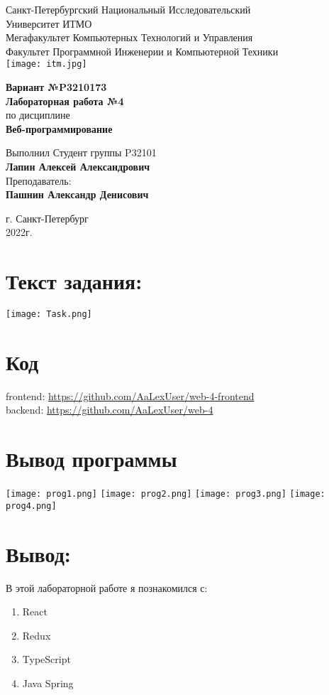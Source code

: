 \documentclass[12pt,one column]{article}
\begin{document}
\begin{center}
    Санкт-Петербургский Национальный Исследовательский\\ 
    Университет ИТМО\\
    Мегафакультет Компьютерных Технологий и Управления\\
    Факультет Программной Инженерии и Компьютерной Техники \\
    \texttt{[image: itm.jpg]} %
\end{center}
\vspace{1cm}


\begin{center}
    \large \textbf{Вариант №P3210173}\\
    \textbf{Лабораторная работа №4}\\
    по дисциплине\\
    \textbf{Веб-программирование}
\end{center}

\vspace{2cm}

\begin{flushright}
  Выполнил Студент  группы P32101\\
  \textbf{Лапин Алексей Александрович}\\
  Преподаватель: \\
  \textbf{Пашнин Александр Денисович}\\
\end{flushright}

\vspace{6cm}
\begin{center}
    г. Санкт-Петербург\\
    2022г.
\end{center}
\newpage
\tableofcontents
\newpage
\section{Текст задания:}
\texttt{[image: Task.png]}
\section{Код}
frontend: 
\href{https://github.com/AaLexUser/web-4-frontend}{https://github.com/AaLexUser/web-4-frontend}\\
backend: \href{https://github.com/AaLexUser/web-4}{https://github.com/AaLexUser/web-4}
\section{Вывод программы}
\texttt{[image: prog1.png]}
\texttt{[image: prog2.png]}
\texttt{[image: prog3.png]}
\texttt{[image: prog4.png]}
\section{Вывод:}
В этой лабораторной работе я познакомился с:
\begin{enumerate}
    \item React
    \item Redux
    \item TypeScript
    \item Java Spring
\end{enumerate}
\end{document}
